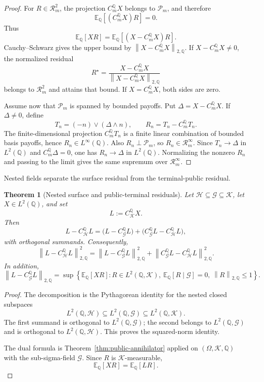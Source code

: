 \documentclass[11pt,a4paper]{amsart}
\theoremstyle{plain}
\newtheorem{theorem}{Theorem}[section]
\theoremstyle{definition}
\theoremstyle{remark}
\newcommand{\QQ}{\mathbb{Q}}
\newcommand{\EE}{\mathbb{E}}
\newcommand{\cG}{\mathcal{G}}
\newcommand{\cH}{\mathcal{H}}
\newcommand{\cK}{\mathcal{K}}
\newcommand{\cP}{\mathcal{P}}
\newcommand{\cR}{\mathcal{R}}
\newcommand{\norm}[1]{\left\lVert #1\right\rVert}
\begin{document}
\begin{proof}
For \(R\in\cR_m^2\), the projection \(C_m^\QQ X\) belongs to \(\cP_m\), and therefore
\[
        \EE_\QQ[(C_m^\QQ X)R]=0.
\]
Thus
\[
        \EE_\QQ[XR]=\EE_\QQ[(X-C_m^\QQ X)R].
\]
Cauchy--Schwarz gives the upper bound by
\(\norm{X-C_m^\QQ X}_{2,\QQ}\).  If \(X-C_m^\QQ X\ne0\), the normalized residual
\[
        R^\star=
        \frac{X-C_m^\QQ X}{\norm{X-C_m^\QQ X}_{2,\QQ}}
\]
belongs to \(\cR_m^2\) and attains that bound.  If \(X=C_m^\QQ X\), both sides are zero.

Assume now that \(\cP_m\) is spanned by bounded payoffs.  Put
\(\Delta=X-C_m^\QQ X\).  If \(\Delta\ne0\), define
\[
        T_n=(-n)\vee(\Delta\wedge n),
        \qquad
        R_n=T_n-C_m^\QQ T_n.
\]
The finite-dimensional projection \(C_m^\QQ T_n\) is a finite linear combination of bounded basis
payoffs, hence \(R_n\in L^\infty(\QQ)\).  Also \(R_n\perp\cP_m\), so \(R_n\in\cR_m^\infty\).
Since \(T_n\to\Delta\) in \(L^2(\QQ)\) and \(C_m^\QQ\Delta=0\), one has
\(R_n\to\Delta\) in \(L^2(\QQ)\).  Normalizing the nonzero \(R_n\) and passing to the limit gives
the same supremum over \(\cR_m^\infty\).
\end{proof}

Nested fields separate the surface residual from the terminal-public residual.

\begin{theorem}[Nested surface and public-terminal residuals]\label{thm:nested-residuals}
Let \(\cH\subseteq\cG\subseteq\cK\), let \(X\in L^2(\QQ)\), and set
\[
        L:=C_{\cK}^{\QQ}X.
\]
Then
\[
        L-C_{\cH}^{\QQ}L
        =
        \bigl(L-C_{\cG}^{\QQ}L\bigr)
        +
        \bigl(C_{\cG}^{\QQ}L-C_{\cH}^{\QQ}L\bigr),
\]
with orthogonal summands.  Consequently,
\[
        \norm{L-C_{\cH}^{\QQ}L}_{2,\QQ}^{2}
        =
        \norm{L-C_{\cG}^{\QQ}L}_{2,\QQ}^{2}
        +
        \norm{C_{\cG}^{\QQ}L-C_{\cH}^{\QQ}L}_{2,\QQ}^{2}.
\]
In addition,
\[
        \norm{L-C_{\cG}^{\QQ}L}_{2,\QQ}
        =
        \sup\left\{
        \EE_\QQ[XR]:
        R\in L^2(\QQ,\cK),\
        \EE_\QQ[R\mid\cG]=0,\
        \norm{R}_{2,\QQ}\le1
        \right\}.
\]
\end{theorem}

\begin{proof}
The decomposition is the Pythagorean identity for the nested closed subspaces
\[
        L^2(\QQ,\cH)\subseteq L^2(\QQ,\cG)\subseteq L^2(\QQ,\cK).
\]
The first summand is orthogonal to \(L^2(\QQ,\cG)\); the second belongs to
\(L^2(\QQ,\cG)\) and is orthogonal to \(L^2(\QQ,\cH)\).  This proves the squared-norm identity.

The dual formula is Theorem~\ref{thm:public-annihilator} applied on
\((\Omega,\cK,\QQ)\) with the sub-sigma-field \(\cG\).  Since \(R\) is \(\cK\)-measurable,
\[
        \EE_\QQ[XR]=\EE_\QQ[LR].
\]
\end{proof}
\end{document}

